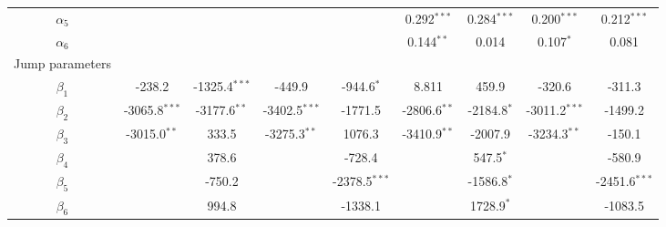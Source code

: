 \documentclass[10pt]{article}
\begin{document}
\begin{landscape}
\begin{center}
\begin{tabular}{c|cccc|cccc}
$\alpha_5$  &                                 &                                  &                                   &                                     &0.292$^{\ast \ast \ast}$  &0.284$^{\ast \ast \ast}$& 0.200$^{\ast \ast \ast}$& 0.212$^{\ast \ast \ast}$\\
$\alpha_6$  &                                 &                                  &                                   &                                    &0.144$^{\ast \ast }$         &0.014                         & 0.107$^{\ast}$              & 0.081                          \\  
Jump parameters&                           &           &           &            &            &            &              &                 \\
$\beta_1$   &-238.2                         &-1325.4$^{\ast\ast\ast}$&-449.9                            &-944.6$^{\ast}$             &8.811                            &459.9                         &-320.6                         &-311.3                      \\
$\beta_2$   &-3065.8$^{\ast\ast\ast}$&-3177.6$^{\ast\ast}     $&-3402.5$^{\ast \ast \ast}$&-1771.5                        &-2806.6$^{\ast \ast}$       &-2184.8$^{\ast}$        &-3011.2$^{\ast\ast\ast}$&-1499.2                      \\
$\beta_3$   &-3015.0$^{\ast\ast}$     &333.5                        &-3275.3$^{\ast \ast}$         &1076.3                           &-3410.9$^{\ast \ast}$     &-2007.9                        &-3234.3$^{\ast\ast}$    &-150.1                       \\  
$\beta_4$   &                                 &378.6                         &                                     &-728.4                            &                                    &547.5$^{\ast}$              &                                  &-580.9                       \\
$\beta_5$   &                                &-750.2                         &                                      &-2378.5$^{\ast \ast \ast}$&                                   &-1586.8$^{\ast}$            &                               &-2451.6$^{\ast \ast \ast}$\\
$\beta_6$   &                                 &994.8                          &                                   &-1338.1                            &                                   &1728.9$^{\ast}$               &                                &-1083.5            \\  

\end{tabular}
\end{center}
\end{landscape}
\end{document}
